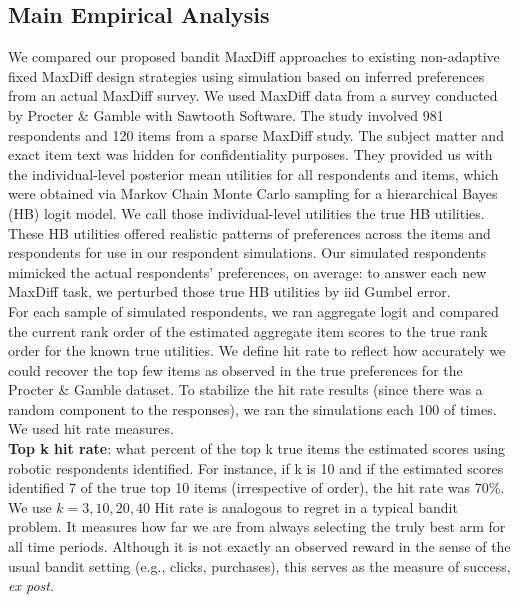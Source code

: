 \documentclass[nonblindrev]{informs3}
\begin{document}
\subsection{Main Empirical Analysis}
We compared our proposed bandit MaxDiff approaches to existing non-adaptive fixed MaxDiff design strategies using simulation based on inferred preferences from an actual MaxDiff survey. We used MaxDiff data from a survey conducted by Procter \& Gamble with Sawtooth Software. The study involved 981 respondents and 120 items from a sparse MaxDiff study. The subject matter and exact item text was hidden for confidentiality purposes. They provided us with the individual-level posterior mean utilities for all respondents and items, which were obtained via Markov Chain Monte Carlo sampling for a hierarchical Bayes (HB) logit model. We call those individual-level utilities the true HB utilities.  These HB utilities offered realistic patterns of preferences across the items and respondents for use in our respondent simulations.  Our simulated respondents mimicked the actual respondents' preferences, on average: to answer each new MaxDiff task, we perturbed those true HB utilities by iid Gumbel error.  \\
For each sample of simulated respondents, we ran aggregate logit and compared the current rank order of the estimated aggregate item scores to the true rank order for the known true utilities.  We define hit rate to reflect how accurately we could recover the top few items as observed in the true preferences for the Procter \& Gamble dataset.  To stabilize the hit rate results (since there was a random component to the responses), we ran the simulations each 100 of times. \\
We used hit rate measures.\\ \textbf{Top k hit rate}: what percent of the top k true items the estimated scores using robotic respondents identified. For instance, if k is 10 and if the estimated scores identified 7 of the true top 10 items (irrespective of order), the hit rate was 70\%. We use $k=3,10,20,40$
Hit rate is analogous to regret in a typical bandit problem. It measures how far we are from always selecting the truly best arm for all time periods. Although it is not exactly an observed reward in the sense of the usual bandit setting (e.g., clicks, purchases), this serves as the measure of success, \textit{ex post}.\\
\end{document}
